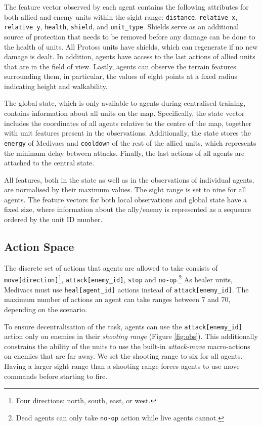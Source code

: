 \documentclass[twoside,11pt]{article}
\begin{document}
The feature vector observed by each agent contains the following attributes for both allied and enemy units within the sight range: \texttt{distance}, \texttt{relative x}, \texttt{relative y}, \texttt{health}, \texttt{shield}, and \texttt{unit\_type}. Shields serve as an additional source of protection that needs to be removed before any damage can be done to the health of units.
All Protoss units have shields, which can regenerate if no new damage is dealt.
In addition, agents have access to the last actions of allied units that are in the field of view. Lastly, agents can observe the terrain features surrounding them, in particular, the values of eight points at a fixed radius indicating height and walkability.

The global state, which is only available to agents during centralised training, contains information about all units on the map. Specifically, the state vector includes the coordinates of all agents relative to the centre of the map, together with unit features present in the observations. Additionally, the state stores the \texttt{energy} of Medivacs and \texttt{cooldown} of the rest of the allied units, which represents the  minimum delay between attacks. Finally, the last actions of all agents are attached to the central state.

All features, both in the state as well as in the observations of individual agents, are normalised by their maximum values. The sight range is set to nine for all agents. The feature vectors for both local observations and global state have a fixed size, where information about the ally/enemy is represented as a sequence ordered by the unit ID number.

\subsection{Action Space}

The discrete set of actions that agents are allowed to take consists of \texttt{move[direction]}\footnote{Four directions: north, south, east, or west.}, \texttt{attack[enemy\_id]}, \texttt{stop} and \texttt{no-op}.\footnote{Dead agents can only take \texttt{no-op} action while live agents cannot.}
As healer units, Medivacs must use \texttt{heal[agent\_id]} actions instead of \texttt{attack[enemy\_id]}. The maximum number of actions an agent can take ranges between 7 and 70, depending on the scenario.

To ensure decentralisation of the task, agents can use the \texttt{attack[enemy\_id]} action only on enemies in their \textit{shooting range} (Figure \ref{fig:obs}).
This additionally constrains the ability of the units to use the built-in \emph{attack-move} macro-actions on enemies that are far away. We set the shooting range to six for all agents. Having a larger sight range than a shooting range forces agents to use move commands before starting to fire.
\end{document}
